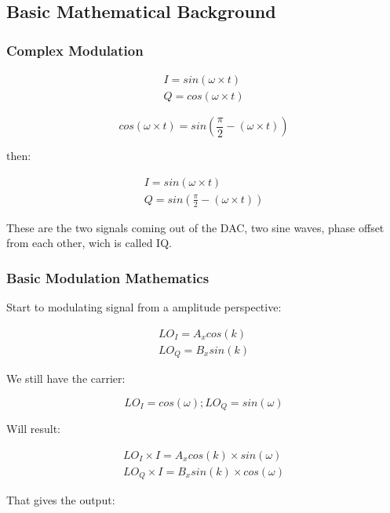 \subsection{Basic Mathematical Background}

\subsubsection{Complex Modulation}

\begin{eqnarray}
	I = sin(\omega \times t)\\
	Q = cos(\omega \times t)
\end{eqnarray}

\begin{equation}
	cos(\omega \times t) = sin(\frac{\pi}{2} - (\omega \times t))
\end{equation}

then:

\begin{eqnarray}
	I = sin(\omega \times t)\\
	Q = sin(\frac{\pi}{2} - (\omega \times t))
\end{eqnarray}

These are the two signals coming out of the DAC, two sine waves, phase offset from each other, wich is called IQ.

\subsubsection{Basic Modulation Mathematics}

Start to modulating signal from a amplitude perspective:

\begin{eqnarray}
LO_I = A_x cos(k)\\
LO_Q = B_x sin(k)
\end{eqnarray}

We still have the carrier:

\begin{equation}
LO_I = cos(\omega) ; LO_Q = sin(\omega)
\end{equation}

Will result:

\begin{eqnarray}
LO_I \times I = A_x cos(k) \times sin(\omega)\\
LO_Q \times I = B_x sin(k) \times cos(\omega)
\end{eqnarray}


That gives the output:

